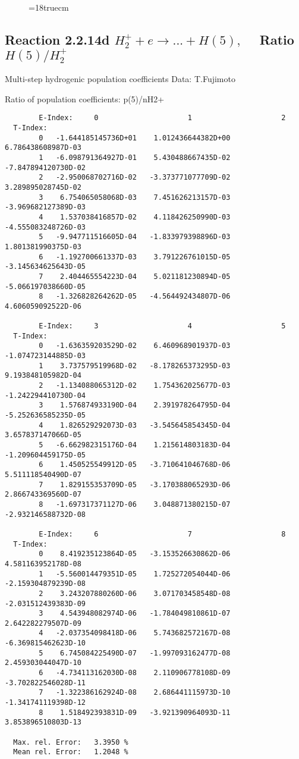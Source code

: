 \begin{figure} \label{2.2.14c}
\epsfxsize=18truecm
\end{figure}
\newpage


\subsection{
Reaction 2.2.14d $ H_2^+ + e \rightarrow ...+ H(5) , \quad  $
Ratio $H(5)/H_2^+  $
}

 Multi-step hydrogenic population coefficients
 Data: T.Fujimoto

 Ratio of population coefficients: p(5)/nH2+

\begin{verbatim}
        E-Index:     0                     1                     2
  T-Index:
        0   -1.644185145736D+01    1.012436644382D+00    6.786438608987D-03
        1   -6.098791364927D-01    5.430488667435D-02   -7.847894120730D-02
        2   -2.950068702716D-02   -3.373771077709D-02    3.289895028745D-02
        3    6.754065058068D-03    7.451626213157D-03   -3.969682127389D-03
        4    1.537038416857D-02    4.118426250990D-03   -4.555083248726D-03
        5   -9.947711516605D-04   -1.833979398896D-03    1.801381990375D-03
        6   -1.192700661337D-03    3.791226761015D-05   -3.145634625643D-05
        7    2.404465554223D-04    5.021181230894D-05   -5.066197038660D-05
        8   -1.326828264262D-05   -4.564492434807D-06    4.606059092522D-06

        E-Index:     3                     4                     5
  T-Index:
        0   -1.636359203529D-02    6.460968901937D-03   -1.074723144885D-03
        1    3.737579519968D-02   -8.178265373295D-03    9.193848105982D-04
        2   -1.134088065312D-02    1.754362025677D-03   -1.242294410730D-04
        3    1.576874933190D-04    2.391978264795D-04   -5.252636585235D-05
        4    1.826529292073D-03   -3.545645854345D-04    3.657837147066D-05
        5   -6.662982315176D-04    1.215614803183D-04   -1.209604459175D-05
        6    1.450525549912D-05   -3.710641046768D-06    5.511118540490D-07
        7    1.829155353709D-05   -3.170388065293D-06    2.866743369560D-07
        8   -1.697317371127D-06    3.048871380215D-07   -2.932146588732D-08

        E-Index:     6                     7                     8
  T-Index:
        0    8.419235123864D-05   -3.153526630862D-06    4.581163952178D-08
        1   -5.560014479351D-05    1.725272054044D-06   -2.159304879239D-08
        2    3.243207880260D-06    3.071703458548D-08   -2.031512439383D-09
        3    4.543948082974D-06   -1.784049810861D-07    2.642282279507D-09
        4   -2.037354098418D-06    5.743682572167D-08   -6.369815462623D-10
        5    6.745084225490D-07   -1.997093162477D-08    2.459303044047D-10
        6   -4.734113162030D-08    2.110906778108D-09   -3.702822546028D-11
        7   -1.322386162924D-08    2.686441115973D-10   -1.341741119398D-12
        8    1.518492393831D-09   -3.921390964093D-11    3.853896510803D-13

  Max. rel. Error:   3.3950 %
  Mean rel. Error:   1.2048 %

\end{verbatim}
